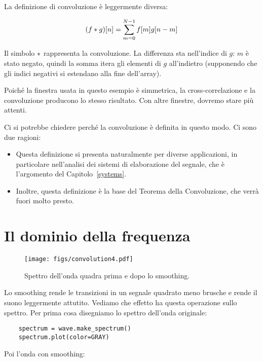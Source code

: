 \documentclass[12pt]{book} \usepackage[width=5.5in,height=8.5in, hmarginratio=3:2,vmarginratio=1:1]{geometry}
\begin{document}
La definizione di convoluzione è leggermente diversa:

%
\[ (f \ast g)[n] = \sum_{m=0}^{N-1} f[m] g[n-m] \] 

%
Il simbolo $\ast$ rappresenta la convoluzione. La differenza sta nell'indice di $g$: $m$ è stato negato, quindi la somma itera gli elementi di $g$ all'indietro (supponendo che gli indici negativi si estendano alla fine dell'array).

Poiché la finestra usata in questo esempio è simmetrica, la cross-correlazione e la convoluzione producono lo stesso risultato. Con altre finestre, dovremo stare più attenti.

Ci si potrebbe chiedere perché la convoluzione è definita in questo modo. Ci sono due ragioni:

\begin{itemize} 

\item Questa definizione si presenta naturalmente per diverse applicazioni, in particolare nell'analisi dei sistemi di elaborazione del segnale, che è l'argomento del Capitolo~\ref{systems}.

\item Inoltre, questa definizione è la base del Teorema della Convoluzione, che verrà fuori molto presto.

\end{itemize} 

\section{Il dominio della frequenza} 

\begin{figure} 

\centerline{\texttt{[image: figs/convolution4.pdf]}} \caption{Spettro dell'onda quadra prima e dopo lo smoothing.} \label{fig.convolution4} \end{figure} 

Lo smoothing rende le transizioni in un segnale quadrato meno brusche e rende il suono leggermente attutito. Vediamo che effetto ha questa operazione sullo spettro. Per prima cosa disegniamo lo spettro dell'onda originale:

\begin{verbatim} 
    spectrum = wave.make_spectrum()
    spectrum.plot(color=GRAY)
 \end{verbatim} 

Poi l'onda con smoothing:
\end{document}
